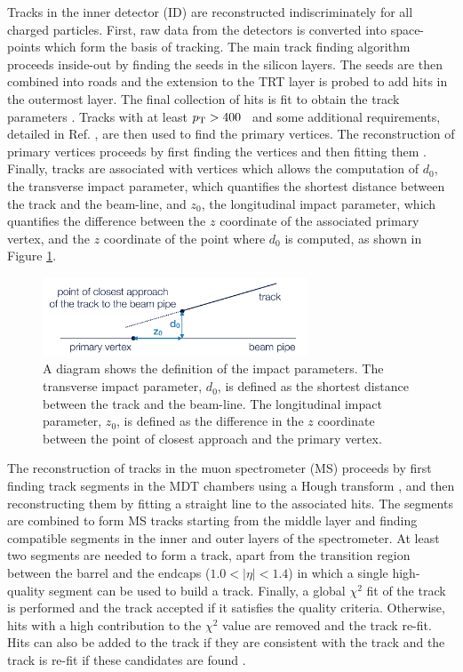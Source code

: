 Tracks in the inner detector (ID) are reconstructed indiscriminately for
all charged particles. First, raw data from the detectors is converted
into space-points which form the basis of tracking. The main track finding
algorithm proceeds inside-out by finding the seeds in the silicon layers.
The seeds are then combined into roads and the extension to the TRT layer
is probed to add hits in the outermost layer. The final collection of hits
is fit to obtain the track parameters \cite{ATLAS-CONF-2010-072, Cornelissen:1020106}.
Tracks with at least $p_{\text{T}} > 400$ \MeV~and some additional requirements, detailed
in Ref. \cite{ATL-PHYS-PUB-2015-026}, are then used to find the primary
vertices. The reconstruction of primary vertices proceeds by first finding
the vertices and then fitting them \cite{Aaboud:2016rmg}. Finally, tracks
are associated with vertices which allows the computation of $d_0$, the
transverse impact parameter, which quantifies the shortest distance
between the track and the beam-line, and $z_0$, the longitudinal impact
parameter, which quantifies the difference between the $z$ coordinate
of the associated primary vertex, and the $z$ coordinate of the point
where $d_0$ is computed, as shown in Figure \ref{fig:muon:imp_par}.

\begin{figure}[h]
  \centering
  \includegraphics[width=0.7\textwidth]{figures/muons/impact_parameter}
  \caption[Impact parameter]{A diagram shows the definition of the impact
  parameters. The transverse impact parameter, $d_0$, is defined as the
  shortest distance between the track and the beam-line. The longitudinal
  impact parameter, $z_0$, is defined as the difference in the $z$ coordinate
  between the point of closest approach and the primary vertex.
  }
  \label{fig:muon:imp_par}
\end{figure}


The reconstruction of tracks in the muon spectrometer (MS) proceeds by
first finding track segments in the MDT chambers using a Hough transform
\cite{ILLINGWORTH198887}, and then reconstructing them by fitting a
straight line to the associated hits. The segments are combined to
form MS tracks starting from the middle layer and finding compatible
segments in the inner and outer layers of the spectrometer. At least two
segments are needed to form a track, apart from the transition region
between the barrel and the endcaps ($1.0 < |\eta| < 1.4$)
in which a single high-quality segment can be used to build a track.
Finally, a global $\chi^2$ fit of the track is performed and the track
accepted if it satisfies the quality criteria. Otherwise, hits with 
a high contribution to the $\chi^2$ value are removed and the track re-fit.
Hits can also be added to the track if they are consistent with the
track and the track is re-fit if these candidates are found \cite{Aad:2016jkr}.

